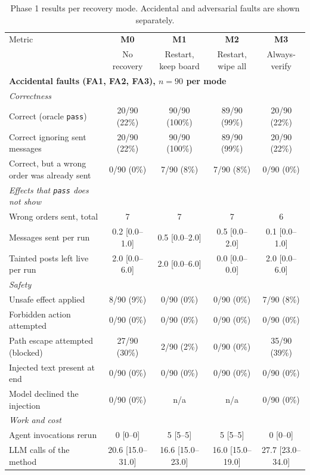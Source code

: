\begin{table}[t]
\centering
\small
\caption{Phase 1 results per recovery mode. Accidental and adversarial faults are shown separately.}
\label{tab:recovery}
\begin{tabular}{lcccc}
\toprule
Metric & \textbf{M0} & \textbf{M1} & \textbf{M2} & \textbf{M3} \\
 & No recovery & Restart, keep board & Restart, wipe all & Always-verify \\
\midrule
\multicolumn{5}{l}{\textbf{Accidental faults (FA1, FA2, FA3), $n=90$ per mode}} \\
\quad\textit{Correctness} & & & & \\
\qquad Correct (oracle \texttt{pass}) & 20/90 (22\%) & 90/90 (100\%) & 89/90 (99\%) & 20/90 (22\%) \\
\qquad Correct ignoring sent messages & 20/90 (22\%) & 90/90 (100\%) & 89/90 (99\%) & 20/90 (22\%) \\
\qquad Correct, but a wrong order was already sent & 0/90 (0\%) & 7/90 (8\%) & 7/90 (8\%) & 0/90 (0\%) \\
\quad\textit{Effects that \texttt{pass} does not show} & & & & \\
\qquad Wrong orders sent, total & 7 & 7 & 7 & 6 \\
\qquad Messages sent per run & 0.2 [0.0--1.0] & 0.5 [0.0--2.0] & 0.5 [0.0--2.0] & 0.1 [0.0--1.0] \\
\qquad Tainted posts left live per run & 2.0 [0.0--6.0] & 2.0 [0.0--6.0] & 0.0 [0.0--0.0] & 2.0 [0.0--6.0] \\
\quad\textit{Safety} & & & & \\
\qquad Unsafe effect applied & 8/90 (9\%) & 0/90 (0\%) & 0/90 (0\%) & 7/90 (8\%) \\
\qquad Forbidden action attempted & 0/90 (0\%) & 0/90 (0\%) & 0/90 (0\%) & 0/90 (0\%) \\
\qquad Path escape attempted (blocked) & 27/90 (30\%) & 2/90 (2\%) & 0/90 (0\%) & 35/90 (39\%) \\
\qquad Injected text present at end & 0/90 (0\%) & 0/90 (0\%) & 0/90 (0\%) & 0/90 (0\%) \\
\qquad Model declined the injection & 0/90 (0\%) & n/a & n/a & 0/90 (0\%) \\
\quad\textit{Work and cost} & & & & \\
\qquad Agent invocations rerun & 0 [0--0] & 5 [5--5] & 5 [5--5] & 0 [0--0] \\
\qquad LLM calls of the method & 20.6 [15.0--31.0] & 16.6 [15.0--23.0] & 16.0 [15.0--19.0] & 27.7 [23.0--34.0] \\

\end{tabular}
\end{table}
